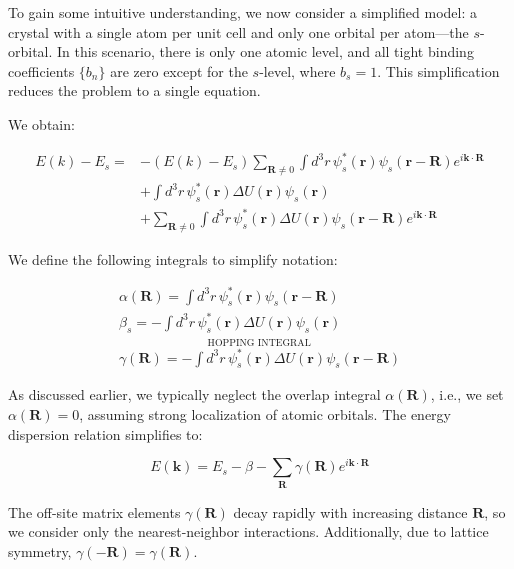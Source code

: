 To gain some intuitive understanding, we now consider a simplified model: a crystal with a single atom per unit cell and only one orbital per atom—the \(s\)-orbital. In this scenario, there is only one atomic level, and all tight binding coefficients \( \{b_n\} \) are zero except for the \(s\)-level, where \( b_s = 1 \). This simplification reduces the problem to a single equation.

We obtain:

\begin{align*}
	E(k) - E_s = & - (E(k) - E_s) \sum_{\mathbf{R} \neq 0} \int d^3r \, \psi_s^*(\mathbf{r}) \psi_s(\mathbf{r} - \mathbf{R}) e^{i\mathbf{k} \cdot \mathbf{R}}         \\
	             & + \int d^3r \, \psi_s^*(\mathbf{r}) \Delta U(\mathbf{r}) \psi_s(\mathbf{r})                                                                        \\
	             & + \sum_{\mathbf{R} \neq 0} \int d^3r \, \psi_s^*(\mathbf{r}) \Delta U(\mathbf{r}) \psi_s(\mathbf{r} - \mathbf{R}) e^{i\mathbf{k} \cdot \mathbf{R}}
\end{align*}

We define the following integrals to simplify notation:

\begin{align}
	\boxed{
		\alpha(\mathbf{R}) = \int d^3r \, \psi_s^*(\mathbf{r}) \psi_s(\mathbf{r} - \mathbf{R})
	} \\[8pt]
	\boxed{
		\beta_s = -\int d^3r \, \psi_s^*(\mathbf{r}) \Delta U(\mathbf{r}) \psi_s(\mathbf{r})
	} \\[8pt]
	\overset{\text{HOPPING INTEGRAL} \,}{\boxed{
			\gamma(\mathbf{R}) = -\int d^3r \, \psi_s^*(\mathbf{r}) \Delta U(\mathbf{r}) \psi_s(\mathbf{r} - \mathbf{R})
		}}
\end{align}



As discussed earlier, we typically neglect the overlap integral \( \alpha(\mathbf{R}) \), i.e., we set \( \alpha(\mathbf{R}) = 0 \), assuming strong localization of atomic orbitals. The energy dispersion relation simplifies to:

\begin{equation}
	\boxed{
		E(\mathbf{k}) = E_s - \beta - \sum_{\mathbf{R}} \gamma(\mathbf{R}) e^{i\mathbf{k} \cdot \mathbf{R}}}
\end{equation}

The off-site matrix elements \( \gamma(\mathbf{R}) \) decay rapidly with increasing distance \( \mathbf{R} \), so we consider only the nearest-neighbor interactions. Additionally, due to lattice symmetry, \( \gamma(-\mathbf{R}) = \gamma(\mathbf{R}) \).

